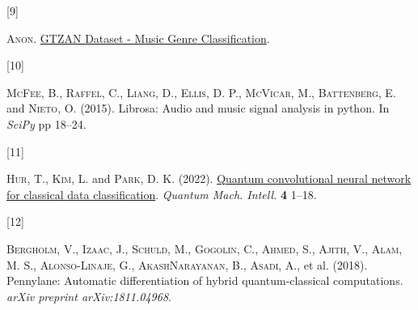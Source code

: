 \documentclass[
  13pt,
  a4paper,
  DIV=11,
  numbers=noendperiod]{scrreprt}
\newlength{\cslhangindent}
\newlength{\csllabelwidth}
\newenvironment{CSLReferences}[2] %
 {\begin{list}{}{%
  \setlength{\itemindent}{0pt}
  \setlength{\leftmargin}{0pt}
  \setlength{\parsep}{0pt}
  \ifodd #1
   \setlength{\leftmargin}{\cslhangindent}
   \setlength{\itemindent}{-1\cslhangindent}
  \fi
  \setlength{\itemsep}{#2\baselineskip}}}
 {\end{list}}
\newcommand{\CSLLeftMargin}[1]{\parbox[t]{\csllabelwidth}{\strut#1\strut}}
\newcommand{\CSLRightInline}[1]{\parbox[t]{\linewidth - \csllabelwidth}{\strut#1\strut}}
\begin{document}
\begin{CSLReferences}{0}{1}
\CSLLeftMargin{{[}9{]} }%
\CSLRightInline{\textsc{Anon}.
\href{https://www.kaggle.com/datasets/andradaolteanu/gtzan-dataset-music-genre-classification?resource=download}{{GTZAN
Dataset - Music Genre Classification}}.}

\CSLLeftMargin{{[}10{]} }%
\CSLRightInline{\textsc{McFee}, B., \textsc{Raffel}, C., \textsc{Liang},
D., \textsc{Ellis}, D. P., \textsc{McVicar}, M., \textsc{Battenberg}, E.
and \textsc{Nieto}, O. (2015). Librosa: Audio and music signal analysis
in python. In \emph{SciPy} pp 18--24.}

\CSLLeftMargin{{[}11{]} }%
\CSLRightInline{\textsc{Hur}, T., \textsc{Kim}, L. and \textsc{Park}, D.
K. (2022). \href{https://doi.org/10.1007/s42484-021-00061-x}{{Quantum
convolutional neural network for classical data classification}}.
\emph{Quantum Mach. Intell.} \textbf{4} 1--18.}

\CSLLeftMargin{{[}12{]} }%
\CSLRightInline{\textsc{Bergholm}, V., \textsc{Izaac}, J.,
\textsc{Schuld}, M., \textsc{Gogolin}, C., \textsc{Ahmed}, S.,
\textsc{Ajith}, V., \textsc{Alam}, M. S., \textsc{Alonso-Linaje}, G.,
\textsc{AkashNarayanan}, B., \textsc{Asadi}, A., et al. (2018).
Pennylane: Automatic differentiation of hybrid quantum-classical
computations. \emph{arXiv preprint arXiv:1811.04968}.}

\end{CSLReferences}
\end{document}
